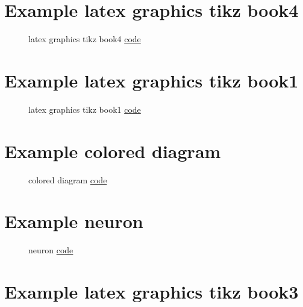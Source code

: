 \documentclass{article}
\begin{document}
\section{Example latex graphics tikz book4}

\begin{figure}[H]
	\centering
	
	\caption{latex graphics tikz book4 \href{https:/github.com/cauliyang/learn_tikz/blob/main/latex_graphics_tikz_book4.tex}{code} }
	\label{fig:latex graphics tikz book4}
\end{figure}

\section{Example latex graphics tikz book1}

\begin{figure}[H]
	\centering
	
	\caption{latex graphics tikz book1 \href{https:/github.com/cauliyang/learn_tikz/blob/main/latex_graphics_tikz_book1.tex}{code} }
	\label{fig:latex graphics tikz book1}
\end{figure}

\section{Example colored diagram}

\begin{figure}[H]
	\centering
	
	\caption{colored diagram \href{https:/github.com/cauliyang/learn_tikz/blob/main/colored_diagram.tex}{code} }
	\label{fig:colored diagram}
\end{figure}

\section{Example neuron}

\begin{figure}[H]
	\centering
	
	\caption{neuron \href{https:/github.com/cauliyang/learn_tikz/blob/main/neuron.tex}{code} }
	\label{fig:neuron}
\end{figure}

\section{Example latex graphics tikz book3}
\end{document}
